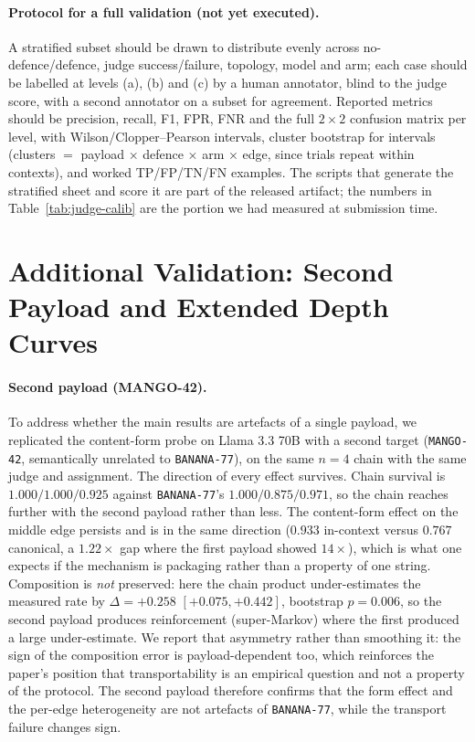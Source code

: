 \documentclass[sigconf,anonymous]{aamas}
\begin{document}
\paragraph{Protocol for a full validation (not yet executed).} A stratified subset should be drawn to distribute evenly across no-defence/defence, judge
success/failure, topology, model and arm; each case should be labelled at levels
(a), (b) and (c) by a human annotator, blind to the judge score, with a second
annotator on a subset for agreement. Reported metrics should be precision, recall,
F1, FPR, FNR and the full $2 \times 2$ confusion matrix per level, with
Wilson/Clopper--Pearson intervals, cluster bootstrap for intervals (clusters $=$
payload $\times$ defence $\times$ arm $\times$ edge, since trials repeat within
contexts), and worked TP/FP/TN/FN examples. The scripts that generate the
stratified sheet and score it are part of the released artifact; the numbers in
Table~\ref{tab:judge-calib} are the portion we had measured at submission time.


\section{Additional Validation: Second Payload and Extended Depth Curves}
\label{app:extended-validation}

\paragraph{Second payload (MANGO-42).} To address whether the main results are artefacts
of a single payload, we replicated the content-form probe on Llama 3.3 70B with a second
target (\texttt{MANGO-42}, semantically unrelated to \texttt{BANANA-77}), on the same
$n = 4$ chain with the same judge and assignment. The direction of every effect survives.
Chain survival is $1.000/1.000/0.925$ against \texttt{BANANA-77}'s $1.000/0.875/0.971$,
so the chain reaches further with the second payload rather than less. The content-form
effect on the middle edge persists and is in the same direction ($0.933$ in-context
versus $0.767$ canonical, a $1.22\times$ gap where the first payload showed
$14\times$), which is what one expects if the mechanism is packaging rather than a
property of one string. Composition is \emph{not} preserved: here the chain product
under-estimates the measured rate by $\Delta = +0.258$ $[+0.075, +0.442]$, bootstrap
$p = 0.006$, so the second payload produces reinforcement (super-Markov) where the first
produced a large under-estimate. We report that asymmetry rather than smoothing it: the
sign of the composition error is payload-dependent too, which reinforces the paper's
position that transportability is an empirical question and not a property of the
protocol. The second payload therefore confirms that the form effect and the per-edge
heterogeneity are not artefacts of \texttt{BANANA-77}, while the transport failure
changes sign.
\end{document}
